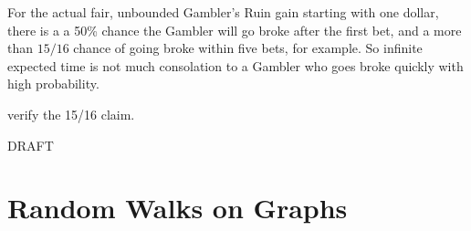 For the actual fair, unbounded Gambler's Ruin gain starting with one
dollar, there is a a 50\% chance the Gambler will go broke after the
first bet, and a more than $15/16$ chance of going broke within five
bets, for example.  So infinite expected time is not much consolation
to a Gambler who goes broke quickly with high probability.

\begin{editingnotes}
verify the 15/16 claim.
\end{editingnotes}

\iffalse

But don't assume this means that the
gambler is \emph{likely} to play for long---there is even a 50\%
chance he will lose the very first bet and go broke right away.

In fact, if the game is unfavorable, then
Theorem~\ref{LN12:ExQthm} and Corollary~\ref{LN12:biaswincor} imply
that his expected time to go broke is essentially proportional to his
initial capital, that is, $\Theta(n)$.

Lemma~\ref{LN12:play forever} says that the gambler can ``expect'' to
play forever, while Lemma~\ref{LN12:go broke} says that he is certain
to go broke.

These facts sound contradictory, but they are sound
consequences of the technical mathematical definition of expectation.
The moral here, as in Section~\ref{infinite_expect_sec}, is that naive
intuition is unreliable when it comes to infinite expectation.

\fi


\begin{problems}
\practiceproblems
{}

\classproblems
{}

\begin{editingnotes}
\homeworkproblems
DRAFT
\end{editingnotes}

\end{problems}


\section{Random Walks on Graphs}\label{Google_sec}

